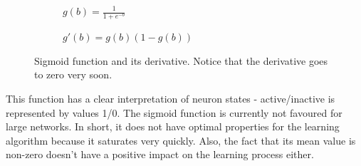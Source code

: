 \begin{figure}[h]  
	\centering 
	\begin{subfigure}[b]{0.4\linewidth}
		\caption{$ g(b)=\frac{1}{1 + e^{-b}} $}   
	\end{subfigure}
	\begin{subfigure}[b]{0.4\linewidth}
		\caption{$ g'(b)=g(b)(1-g(b)) $}  
	\end{subfigure}
	\vspace{10mm}
	\caption{Sigmoid function and its derivative. Notice that the derivative goes to zero very soon.}
\end{figure}

%		


This function has a clear interpretation of neuron states - active/inactive is represented by values 1/0. The sigmoid function is currently not favoured for large networks. In short, it does not have optimal properties for the learning algorithm because it saturates very quickly. Also, the fact that its mean value is non-zero doesn't have a positive impact on the learning process either. \cite{stanford-github} \cite{groman}

